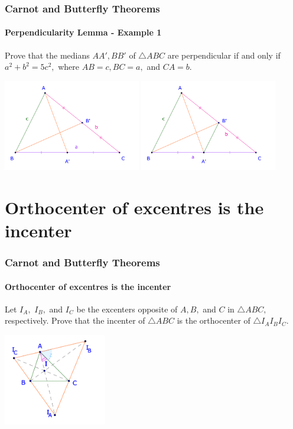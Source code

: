 \documentclass[8pt,xcolor=table,dvipsnames]{beamer}
\begin{document}
\begin{frame}[t]
    \frametitle{Carnot and Butterfly Theorems}
    \framesubtitle{Perpendicularity Lemma - Example 1}
    \begin{example}
        Prove that the medians $AA', BB'$ of $\triangle ABC$ are perpendicular if and only if $a^2 + b^2 = 5c^2,$
        where $AB=c, BC=a,$ and $CA=b.$
    \end{example}
    \begin{overprint}
        \centering\includegraphics[width=6cm]{./svg/pdf/24-25-s9-g3-p9.pdf}
        \centering\includegraphics[width=6cm]{./svg/pdf/24-25-s9-g3-p9-2.pdf}
    \end{overprint}        
\end{frame}

\section{Orthocenter of excentres is the incenter}

\begin{frame}[t]
    \frametitle{Carnot and Butterfly Theorems}
    \framesubtitle{Orthocenter of excentres is the incenter}
    \begin{example}
        Let $I_A,$ $I_B,$ and $I_C$ be the excenters opposite of $A, B,$ and $C$ in $\triangle ABC,$ respectively.
        Prove that the incenter of $\triangle ABC$ is the orthocenter of $\triangle I_A I_B I_C.$
    \end{example}
    \begin{center}
        \includegraphics[width=4.5cm]{./svg/pdf/24-25-s7-g3-t4.pdf}
    \end{center}
\end{frame}
\end{document}
